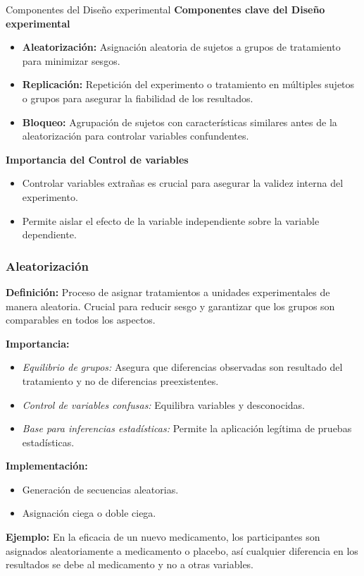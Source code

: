 ﻿\documentclass{beamer}
\begin{document}
\begin{frame}{Componentes del Diseño experimental}
\textbf{Componentes clave del Diseño experimental}

\begin{itemize}
    \item \textbf{Aleatorización:} Asignación aleatoria de sujetos a grupos de tratamiento para minimizar sesgos.
    \item \textbf{Replicación:} Repetición del experimento o tratamiento en múltiples sujetos o grupos para asegurar la fiabilidad de los resultados.
    \item \textbf{Bloqueo:} Agrupación de sujetos con características similares antes de la aleatorización para controlar variables confundentes.
\end{itemize}

\textbf{Importancia del Control de variables}
\begin{itemize}
    \item Controlar variables extrañas es crucial para asegurar la validez interna del experimento.
    \item Permite aislar el efecto de la variable independiente sobre la variable dependiente.
\end{itemize}

\end{frame}

\begin{frame}
\frametitle{Aleatorización}
\textbf{Definición:} Proceso de asignar tratamientos a unidades experimentales de manera aleatoria. Crucial para reducir  sesgo y garantizar que los grupos son comparables en todos los aspectos.

\textbf{Importancia:}
\begin{itemize}
    \item \textit{Equilibrio de grupos:} Asegura que diferencias observadas son resultado del tratamiento y no de diferencias preexistentes.
    \item \textit{Control de variables confusas:} Equilibra variables y desconocidas.
    \item \textit{Base para inferencias estadísticas:} Permite la aplicación legítima de pruebas estadísticas.
\end{itemize}

\textbf{Implementación:}
\begin{itemize}
    \item Generación de secuencias aleatorias.
    \item Asignación ciega o doble ciega.
\end{itemize}

\textbf{Ejemplo:} En la eficacia de un nuevo medicamento, los participantes son asignados aleatoriamente a medicamento o placebo, así cualquier diferencia en los resultados se debe al medicamento y no a otras variables.
\end{frame}
\end{document}
